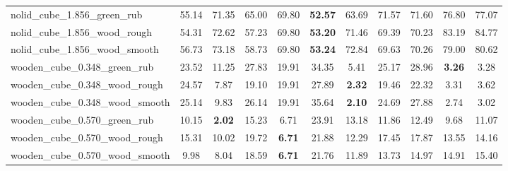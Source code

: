 \begin{table}[H]
{\begin{tabular}{l cccccccccc}
        nolid\_cube\_1.856\_green\_rub & 55.14 & 71.35 & 65.00 & 69.80 & \textbf{52.57} & 63.69 & 71.57 & 71.60 & 76.80 & 77.07 \\
        nolid\_cube\_1.856\_wood\_rough & 54.31 & 72.62 & 57.23 & 69.80 & \textbf{53.20} & 71.46 & 69.39 & 70.23 & 83.19 & 84.77 \\
        nolid\_cube\_1.856\_wood\_smooth & 56.73 & 73.18 & 58.73 & 69.80 & \textbf{53.24} & 72.84 & 69.63 & 70.26 & 79.00 & 80.62 \\
        wooden\_cube\_0.348\_green\_rub & 23.52 & 11.25 & 27.83 & 19.91 & 34.35 & 5.41 & 25.17 & 28.96 & \textbf{3.26} & 3.28 \\
        wooden\_cube\_0.348\_wood\_rough & 24.57 & 7.87 & 19.10 & 19.91 & 27.89 & \textbf{2.32} & 19.46 & 22.32 & 3.31 & 3.62 \\
        wooden\_cube\_0.348\_wood\_smooth & 25.14 & 9.83 & 26.14 & 19.91 & 35.64 & \textbf{2.10} & 24.69 & 27.88 & 2.74 & 3.02 \\
        wooden\_cube\_0.570\_green\_rub & 10.15 & \textbf{2.02} & 15.23 & 6.71 & 23.91 & 13.18 & 11.86 & 12.49 & 9.68 & 11.07 \\
        wooden\_cube\_0.570\_wood\_rough & 15.31 & 10.02 & 19.72 & \textbf{6.71} & 21.88 & 12.29 & 17.45 & 17.87 & 13.55 & 14.16 \\
        wooden\_cube\_0.570\_wood\_smooth & 9.98 & 8.04 & 18.59 & \textbf{6.71} & 21.76 & 11.89 & 13.73 & 14.97 & 14.91 & 15.40 \\
        \bottomrule
    \end{tabular}
    }
\end{table}
